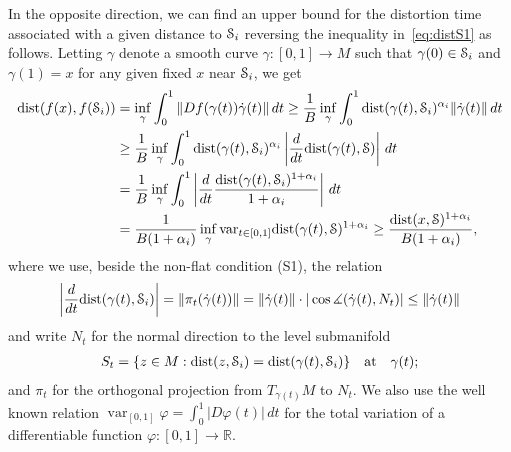 \documentclass[reqno,12pt,a4paper]{amsart}
\theoremstyle{plain}
\theoremstyle{definition}
\begin{document}
  In the opposite direction, we can find an upper bound for
  the distortion time associated with a given distance to
  ${\EuScript{S}}_i$ reversing the inequality in~\eqref{eq:distS1} as
  follows. Letting $\gamma$ denote a smooth curve
  $\gamma:[0,1]\to M$ such that $\gamma(0)\in{\EuScript{S}}_i$ and
  $\gamma(1)=x$ for any given fixed $x$ near ${\EuScript{S}}_i$, we get
  \begin{align}
    {\operatorname{dist}}(f(x),f({\EuScript{S}}_i))
    &=
    \inf_\gamma \int_0^1
    \|Df(\gamma(t))\dot\gamma(t)\|\,dt
    \ge
    \frac1B\inf_\gamma
    \int_0^1 {\operatorname{dist}}(\gamma(t),{\EuScript{S}}_i)^{\alpha_i}
    \|\dot\gamma(t)\|\,dt \nonumber
    \\
    &\ge
    \frac1B \inf_\gamma
    \int_0^1 {\operatorname{dist}}(\gamma(t),{\EuScript{S}}_i)^{\alpha_i}
    \left|\frac{d}{dt}{\operatorname{dist}}(\gamma(t),{\EuScript{S}})\right| \, dt
    \nonumber
    \\
    &=
    \frac1B \inf_\gamma
    \int_0^1\left|
      \frac{d}{dt}
      \frac{{\operatorname{dist}}(\gamma(t),{\EuScript{S}}_i)^{1+\alpha_i}}{1+\alpha_i}
    \right| \, dt
    \nonumber
    \\
    &=
    \frac1{B(1+\alpha_i)} \inf_\gamma
      {\operatorname{var}}_{t\in[0,1]}{\operatorname{dist}}(\gamma(t),{\EuScript{S}})^{1+\alpha_i}
    \ge\label{eq:distS2}
    \frac{{\operatorname{dist}}(x,{\EuScript{S}})^{1+\alpha_i}}{B(1+\alpha_i)},
  \end{align}
  where we use, beside the non-flat condition (S1), the
  relation
  \begin{align*}
    \left|\frac{d}{dt}{\operatorname{dist}}(\gamma(t),{\EuScript{S}}_i)\right|=
    \|\pi_t(\dot\gamma(t))\|=\|\dot\gamma(t)\|\cdot |\cos
    \measuredangle(\dot\gamma(t),N_t)|\le \|\dot\gamma(t)\|
  \end{align*}
  and write $N_t$ for the normal direction to the level
  submanifold
  \begin{align*}
    S_t=\{z\in M:{\operatorname{dist}}(z,{\EuScript{S}}_i)={\operatorname{dist}}(\gamma(t),{\EuScript{S}}_i)\}
    \quad\text{at}\quad \gamma(t);
  \end{align*}
  and $\pi_t$ for the orthogonal projection from
  $T_{\gamma(t)}M$ to $N_t$. We also use the well known
  relation $ {\operatorname{var}}_{[0,1]} {\varphi} = \int_0^1 |D{\varphi}(t)|
  \,dt$ for the total variation of a differentiable function
  ${\varphi}:[0,1]\to{{\mathbb R}}$.
\end{document}
